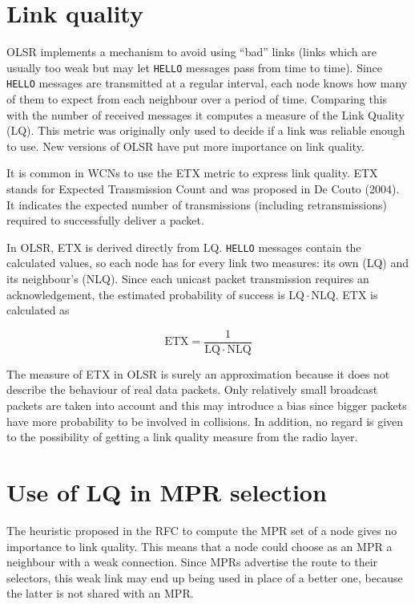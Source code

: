 \documentclass[oneside,openany]{memoir}
\newcommand{\etx}{\mathrm{ETX}}
\newcommand{\linkq}{\mathrm{LQ}}
\newcommand{\nlq}{\mathrm{NLQ}}
\begin{document}
\section{Link quality}\label{link-quality}

OLSR implements a mechanism to avoid using ``bad'' links (links which
are usually too weak but may let \texttt{HELLO} messages pass from time
to time). Since \texttt{HELLO} messages are transmitted at a regular
interval, each node knows how many of them to expect from each neighbour
over a period of time. Comparing this with the number of received
messages it computes a measure of the Link Quality (LQ). This metric was
originally only used to decide if a link was reliable enough to use. New
versions of OLSR have put more importance on link quality.

It is common in WCNs to use the ETX metric to express link quality. ETX
stands for Expected Transmission Count and was proposed in De Couto
(2004). It indicates the expected number of transmissions (including
retransmissions) required to successfully deliver a packet.

In OLSR, ETX is derived directly from LQ. \texttt{HELLO} messages
contain the calculated values, so each node has for every link two
measures: its own (LQ) and its neighbour's (NLQ). Since each unicast packet
transmission requires an acknowledgement, the estimated probability of
success is $\linkq \cdot \nlq$. ETX is calculated as

\begin{equation}
\etx = \frac{1}{\linkq \cdot \nlq}
\end{equation}

The measure of ETX in OLSR is surely an approximation because it does not
describe the behaviour of real data packets. Only relatively small broadcast
packets are taken into account and this may introduce a bias since bigger
packets have more probability to be involved in collisions.
In addition, no regard is given to the possibility of getting a link quality
measure from the radio layer.

\section{Use of LQ in MPR selection}\label{use-of-lq-in-mpr-selection}

The heuristic proposed in the RFC to compute the MPR set of a node gives
no importance to link quality. This means that a node could choose as an
MPR a neighbour with a weak connection. Since MPRs advertise the route
to their selectors, this weak link may end up being used in place of a
better one, because the latter is not shared with an MPR.
\end{document}
